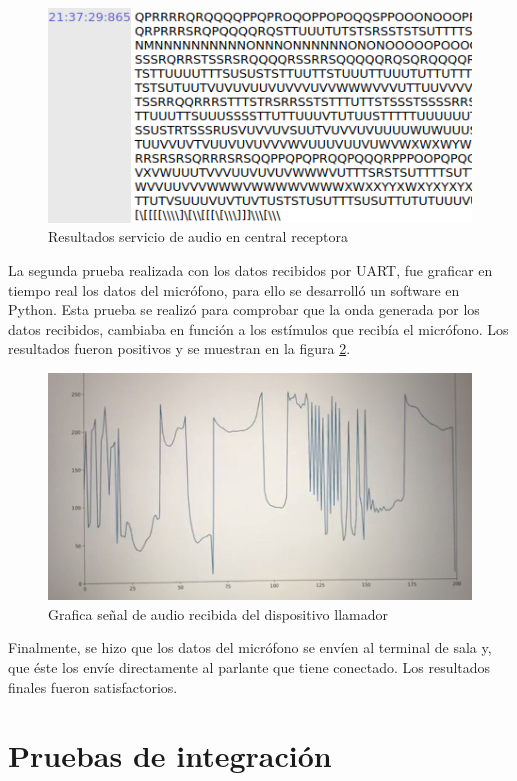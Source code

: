 \begin{figure}[htpb]
	\centering
	\includegraphics[scale=0.5]{./Figures/acsCR.png}	
	\caption{Resultados servicio de audio en central receptora}
	\label{fig:Pacs2}
\end{figure}

La segunda prueba realizada con los datos recibidos por UART, fue graficar en tiempo real los datos del micrófono, para ello se desarrolló un software en Python. Esta prueba se realizó para comprobar que la onda generada por los datos recibidos, cambiaba en función a los estímulos que recibía el micrófono. Los resultados fueron positivos y se muestran en la figura \ref{fig:Psau}.

\begin{figure}[htpb]
	\centering
	\includegraphics[scale=0.4]{./Figures/callpython.jpeg}	
	\caption{Grafica señal de audio recibida del dispositivo llamador}
	\label{fig:Psau}
\end{figure}

Finalmente, se hizo que los datos del micrófono se envíen al terminal de sala y, que éste los envíe directamente al parlante que tiene conectado. Los resultados finales fueron satisfactorios.

\section{Pruebas de integración}
\label{sec:pruebasInt}

